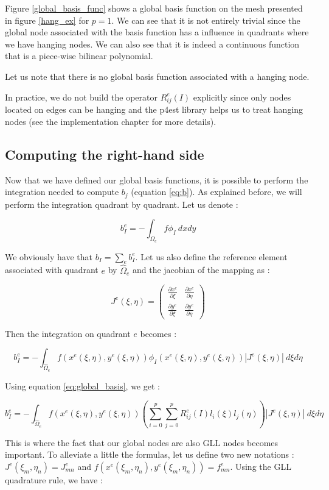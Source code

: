 Figure \ref{global_basis_func} shows a global basis function on the mesh presented in figure \ref{hang_ex} for $p=1$. We can see that it is not entirely trivial since the global node associated with the basis function has a influence in quadrants where we have hanging nodes. We can also see that it is indeed a continuous function that is a piece-wise bilinear polynomial. 

Let us note that there is no global basis function associated with a hanging node. 

In practice, we do not build the operator $R^e_{ij}(I)$ explicitly since only nodes located on edges can be hanging and the p4est library helps us to treat hanging nodes (see the implementation chapter for more details).  

\subsection{Computing the right-hand side}

Now that we have defined our global basis functions, it is possible to perform the integration needed to compute $b_j$ (equation \ref{eq:b}). As explained before, we will perform the integration quadrant by quadrant. Let us denote : 

$$ b_I^e = -\int_{\Omega_e} f\phi_I\:dxdy$$

We obviously have that $b_I = \sum_e b_I^e$. Let us also define the reference element associated with quadrant $e$ by $\hat{\Omega}_e$ and the jacobian of the mapping as : 

$$ J^e (\xi,\eta) = \begin{pmatrix}
\frac{\partial x^e}{\partial \xi} & \frac{\partial x^e}{\partial \eta}\\
\frac{\partial y^e}{\partial \xi} & \frac{\partial y^e}{\partial \eta}
\end{pmatrix}$$

Then the integration on quadrant $e$ becomes : 

$$b_I^e = -\int_{\hat{\Omega}_e} f(x^e(\xi,\eta),y^e(\xi,\eta)) \phi_I(x^e(\xi,\eta),y^e(\xi,\eta)) |J^e(\xi,\eta)| \: d\xi d\eta$$

Using equation \ref{eq:global_basis}, we get : 

$$b_I^e = -\int_{\hat{\Omega}_e} f(x^e(\xi,\eta),y^e(\xi,\eta)) \left( \sum_{i=0}^p\sum_{j=0}^p R^e_{ij}(I) l_i(\xi)l_j(\eta) \right) |J^e(\xi,\eta)| \: d\xi d\eta $$

This is where the fact that our global nodes are also GLL nodes becomes important. To alleviate a little the formulas, let us define two new notations :  $J^e(\xi_m,\eta_n) = J^e_{mn}$ and $f(x^e(\xi_m,\eta_n),y^e(\xi_m,\eta_n)) = f^e_{mn}$. Using the GLL quadrature rule, we have : 

